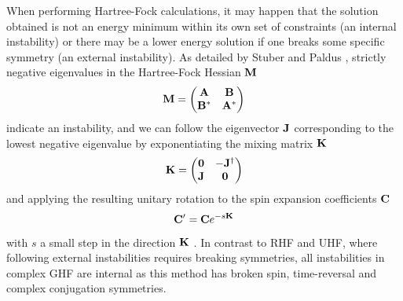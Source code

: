 \documentclass[journal=jctc,manuscript=article]{achemso}
\begin{document}
        When performing Hartree-Fock calculations, it may happen that the solution obtained is not an energy minimum within its own set of constraints (an internal instability) or there may be a lower energy solution if one breaks some specific symmetry (an external instability). As detailed by Stuber and Paldus \cite{stuber2003a}, strictly negative eigenvalues in the Hartree-Fock Hessian $\vb{M}$
        \begin{equation}
            \vb{M}
            = \begin{pmatrix}
                \vb{A} & \vb{B} \\
                \vb{B^*} & \vb{A^*}
            \end{pmatrix}
        \end{equation}
        indicate an instability, and we can follow the eigenvector $\vb{J}$ corresponding to the lowest negative eigenvalue by exponentiating the mixing matrix $\vb{K}$
        \begin{equation}
            \vb{K}
            = \begin{pmatrix}
                \vb{0} & -\vb{J}^\dagger \\
                \vb{J} & \vb{0}
            \end{pmatrix}
        \end{equation}
        and applying the resulting unitary rotation to the spin expansion coefficients $\vb{C}$
        \begin{equation}
            \vb{C}' = \vb{C} e^{-s\vb{K}}
        \end{equation}
        with $s$ a small step in the direction $\vb{K}$ \cite{Goings.2015}. 
        In contrast to RHF and UHF, where following external instabilities requires breaking symmetries, all instabilities in complex GHF are internal as this method has broken spin, time-reversal and complex conjugation symmetries.
\end{document}
